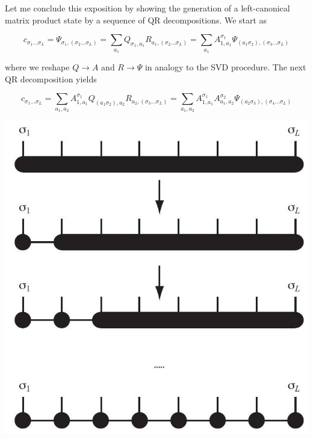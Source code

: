 \documentclass[12pt]{article}
\begin{document}
Let me conclude this exposition by showing the generation of a left-canonical matrix product state by a sequence of QR decompositions. We start as


\begin{equation*}
c_{\sigma_{1} \ldots \sigma_{L}}=\Psi_{\sigma_{1},\left(\sigma_{2} \ldots \sigma_{L}\right)}=\sum_{a_{1}} Q_{\sigma_{1}, a_{1}} R_{a_{1},\left(\sigma_{2} \ldots \sigma_{L}\right)}=\sum_{a_{1}} A_{1, a_{1}}^{\sigma_{1}} \Psi_{\left(a_{1} \sigma_{2}\right),\left(\sigma_{3} \ldots \sigma_{L}\right)} \tag{42}
\end{equation*}


where we reshape $Q \rightarrow A$ and $R \rightarrow \Psi$ in analogy to the SVD procedure. The next QR decomposition yields


\begin{equation*}
c_{\sigma_{1} \ldots \sigma_{L}}=\sum_{a_{1}, a_{2}} A_{1, a_{1}}^{\sigma_{1}} Q_{\left(a_{1} \sigma_{2}\right), a_{2}} R_{a_{2},\left(\sigma_{3} \ldots \sigma_{L}\right)}=\sum_{a_{1}, a_{2}} A_{1, a_{1}}^{\sigma_{1}} A_{a_{1}, a_{2}}^{\sigma_{2}} \Psi_{\left(a_{2} \sigma_{3}\right),\left(\sigma_{4} \ldots \sigma_{L}\right)} \tag{43}
\end{equation*}


\begin{center}
\includegraphics[max width=\textwidth]{2024_05_04_afc4ad226da9ccfe0ac8g-021}
\end{center}
\end{document}
